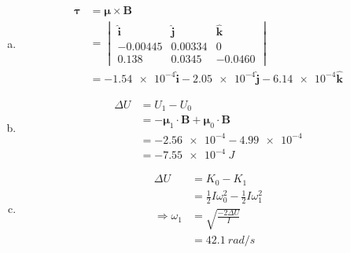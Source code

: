 \documentclass{article}
\begin{document}
\begin{enumerate}[(a)]
  \item

        \begin{align*}
          \boldsymbol{\tau} & = \boldsymbol{\mu} \times \mathbf{B}                                                                \\
                            & = \begin{vmatrix}
                                  \hat{\mathbf{i}} & \hat{\mathbf{j}} & \hat{\mathbf{k}} \\
                                  -0.00445         & 0.00334          & 0                \\
                                  0.138            & 0.0345           & -0.0460
                                \end{vmatrix}  \\
                            & = \num{-1.54e-4} \hat{\mathbf{i}} - \num{2.05e-4} \hat{\mathbf{j}} - \num{6.14e-4} \hat{\mathbf{k}}
        \end{align*}

  \item

        \begin{align*}
          \Delta U & = U_1 - U_0                                                                  \\
                   & = -\boldsymbol{\mu}_1 \cdot \mathbf{B} + \boldsymbol{\mu}_0 \cdot \mathbf{B} \\
                   & = \num{-2.56e-4} - \num{4.99e-4}                                             \\
                   & = \qty{-7.55e-4}{J}
        \end{align*}

  \item

        \begin{align*}
          \Delta U             & = K_0 - K_1                                           \\
                               & = \frac{1}{2} I \omega_0^2 - \frac{1}{2} I \omega_1^2 \\
          \Rightarrow \omega_1 & = \sqrt{\frac{-2 \Delta U}{I}}                        \\
                               & = \qty{42.1}{rad/s}
        \end{align*}
\end{enumerate}
\end{document}
